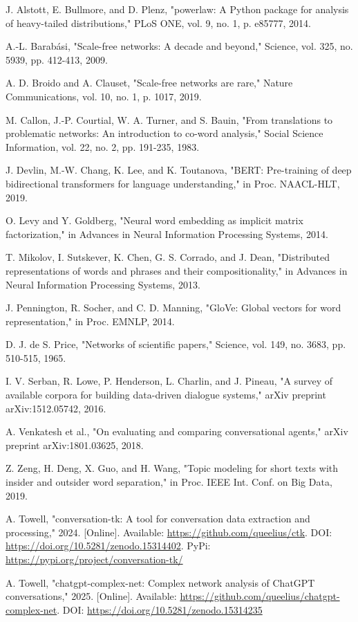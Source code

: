 \documentclass[10pt, a4paper]{article}
\begin{document}

\begin{thebibliography}{00}

 J. Alstott, E. Bullmore, and D. Plenz, "powerlaw: A Python package for analysis of heavy-tailed distributions," PLoS ONE, vol. 9, no. 1, p. e85777, 2014.

 A.-L. Barabási, "Scale-free networks: A decade and beyond," Science, vol. 325, no. 5939, pp. 412-413, 2009.

 A. D. Broido and A. Clauset, "Scale-free networks are rare," Nature Communications, vol. 10, no. 1, p. 1017, 2019.

 M. Callon, J.-P. Courtial, W. A. Turner, and S. Bauin, "From translations to problematic networks: An introduction to co-word analysis," Social Science Information, vol. 22, no. 2, pp. 191-235, 1983.

 J. Devlin, M.-W. Chang, K. Lee, and K. Toutanova, "BERT: Pre-training of deep bidirectional transformers for language understanding," in Proc. NAACL-HLT, 2019.

 O. Levy and Y. Goldberg, "Neural word embedding as implicit matrix factorization," in Advances in Neural Information Processing Systems, 2014.

 T. Mikolov, I. Sutskever, K. Chen, G. S. Corrado, and J. Dean, "Distributed representations of words and phrases and their compositionality," in Advances in Neural Information Processing Systems, 2013.

 J. Pennington, R. Socher, and C. D. Manning, "GloVe: Global vectors for word representation," in Proc. EMNLP, 2014.

 D. J. de S. Price, "Networks of scientific papers," Science, vol. 149, no. 3683, pp. 510-515, 1965.

 I. V. Serban, R. Lowe, P. Henderson, L. Charlin, and J. Pineau, "A survey of available corpora for building data-driven dialogue systems," arXiv preprint arXiv:1512.05742, 2016.

 A. Venkatesh et al., "On evaluating and comparing conversational agents," arXiv preprint arXiv:1801.03625, 2018.

 Z. Zeng, H. Deng, X. Guo, and H. Wang, "Topic modeling for short texts with insider and outsider word separation," in Proc. IEEE Int. Conf. on Big Data, 2019.

 A. Towell, "conversation-tk: A tool for conversation data extraction and processing," 2024. [Online]. Available: \url{https://github.com/queelius/ctk}. DOI: \url{https://doi.org/10.5281/zenodo.15314402}. PyPi: \url{https://pypi.org/project/conversation-tk/}

 A. Towell, "chatgpt-complex-net: Complex network analysis of ChatGPT conversations," 2025. [Online]. Available: \url{https://github.com/queelius/chatgpt-complex-net}. DOI: \url{https://doi.org/10.5281/zenodo.15314235}

\end{thebibliography}
\end{document}
